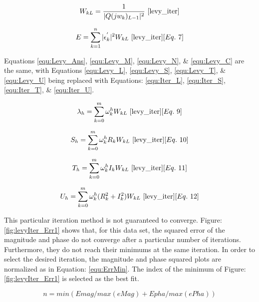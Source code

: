 \begin{equation}
    \label{equ:iter_Weight}
    W_{kL} = \frac{1}{|Q(jw_k)_{L-1}|^2}
    ~\cite{levy_iter}
\end{equation}

\begin{equation}
    \label{equ:iter_Err}
    E = \sum_{k=1}^{n} |\epsilon _k ^{'}|^2W_{kL}
    ~\cite{levy_iter}[Eq.~7]
\end{equation}

Equations \eqref{equ:Levy_Ans}, \eqref{equ:Levy_M}, \eqref{equ:Levy_N}, \& \eqref{equ:Levy_C} are the same, with Equations \eqref{equ:Levy_L}, \eqref{equ:Levy_S}, \eqref{equ:Levy_T}, \& \eqref{equ:Levy_U} being replaced with Equations: \eqref{equ:Iter_L}, \eqref{equ:Iter_S}, \eqref{equ:Iter_T}, \& \eqref{equ:Iter_U}.

\begin{equation}
    \label{equ:Iter_L}
    \lambda _h = \sum_{k=0}^{m} \omega _k ^hW_{kL}
    ~\cite{levy_iter}[Eq.~9]
\end{equation}

\begin{equation}
    \label{equ:Iter_S}
    S_h = \sum_{k=0}^{m} \omega _k ^h R_kW_{kL}
    ~\cite{levy_iter}[Eq.~10]
\end{equation}

\begin{equation}
    \label{equ:Iter_T}
    T_h = \sum_{k=0}^{m} \omega _k ^h I_kW_{kL}
    ~\cite{levy_iter}[Eq.~11]
\end{equation}

\begin{equation}
    \label{equ:Iter_U}
    U_h = \sum_{k=0}^{m} \omega _k ^h (R_k ^2 + I_k ^2)W_{kL}
    ~\cite{levy_iter}[Eq.~12]
\end{equation}


This particular iteration method is not guaranteed to converge. Figure: \ref{fig:levyIter_Err1} shows that, for this data set, the squared error of the magnitude and phase do not converge after a particular number of iterations. Furthermore, they do not reach their minimums at the same iteration. In order to select the desired iteration, the magnitude and phase squared plots are normalized as in Equation: \eqref{equ:ErrMin}. The index of the minimum of Figure: \ref{fig:levyIter_Err1} is selected as the best fit.

\begin{equation}
\label{equ:ErrMin}
n = min(Emag/max(eMag) + Epha/max(ePha))
\end{equation}


